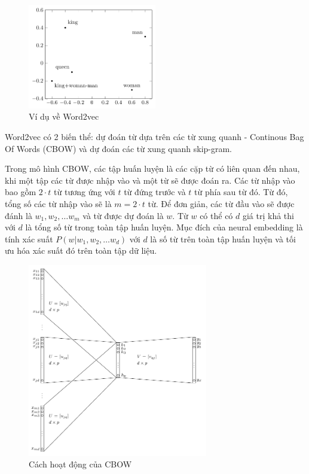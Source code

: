 \begin{figure}[htb]
    \centering
    \includegraphics[width=0.5\textwidth]{tikz_image/word2vec_example.pdf}
    \caption{Ví dụ về Word2vec}
    \label{figure:word2vec-example}
\end{figure}

Word2vec có 2 biến thể: dự đoán từ dựa trên các từ xung quanh - Continous Bag Of Words (CBOW) và dự đoán các từ xung quanh skip-gram.

Trong mô hình CBOW, các tập huấn luyện là các cặp từ có liên quan đến nhau, khi một tập các từ được nhập vào và một từ sẽ được đoán ra. Các từ nhập vào bao gồm $2\cdot t$ từ tương ứng với $t$ từ đứng trước và $t$ từ phía sau từ đó. Từ đó, tổng số các từ nhập vào sẽ là $m = 2\cdot t$ từ. Để đơn giản, các từ đầu vào sẽ được đánh là $w_1, w_2,\dots w_m$  và từ được dự đoán là $w$. Từ $w$ có thể có $d$ giá trị khả thi với $d$ là tổng số từ trong toàn tập huấn luyện. Mục đích của neural embedding là tính xác suất $P(w|w_1,w_2,\dots w_d)$ với $d$ là số từ trên toàn tập huấn luyện và tối ưu hóa xác suất đó trên toàn tập dữ liệu.
\begin{figure}[htb!]
    \centering
    \includegraphics[width=0.7\textwidth]{tikz_image/word2vec_cbow.pdf}
    \caption{Cách hoạt động của CBOW \cite{Aggarwal2022-xj}}
    \label{figure:word2vec-cbow}
\end{figure}

